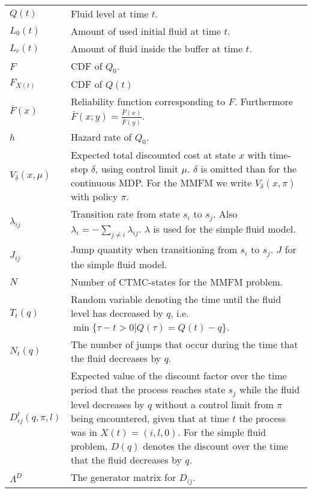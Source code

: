 \begin{tabularx}{\linewidth}{l|L}
        $Q(t)$& Fluid level at time $t$.\\
        $L_0(t)$& Amount of used initial fluid at time $t$.\\
        $L_c(t)$& Amount of fluid inside the buffer at time $t$.\\
        $F$ & CDF of $Q_0$.\\
        $F_{X(t)}$ & CDF of $Q(t)$\\
        $\bar F(x)$& Reliability function corresponding to $F$. Furthermore $\bar F(x;y)=\frac{\bar F(x)}{\bar F(y)}$.\\
        $h$& Hazard rate of $Q_0$.\\                       
		$V_\delta(x,\mu)$ & Expected total discounted cost at state $x$ with time-step $\delta$, using control limit $\mu$. $\delta$ is omitted than for the continuous MDP. For the MMFM we write $V_\delta(x,\pi)$ with policy $\pi$.            \\
		$\lambda_{ij}$& Transition rate from state $s_i$ to $s_j$. Also $\lambda_i=-\sum_{j\neq i}\lambda_{ij}$. $\lambda$ is used for the simple fluid model.\\
		$J_{ij}$& Jump quantity when transitioning from $s_i$ to $s_j$. $J$ for the simple fluid model.\\
		$N$& Number of CTMC-states for the MMFM problem.\\
		$T_t(q)$&Random variable denoting the time until the fluid level has decreased by $q$, i.e. $\min\{\tau-t>0|Q(\tau)=Q(t)-q\}$.\\
		$N_t(q)$&The number of jumps that occur during the time that the fluid decreases by $q$.\\
		$D_{ij}^t(q,\pi,l)$&Expected value of the discount factor over the time period that the process reaches state $s_j$ while the fluid level decreases by $q$ without a control limit from $\pi$ being encountered, given that at time $t$ the process was in $X(t)= (i,l,0)$. For the simple fluid problem, $D(q)$ denotes the discount over the time that the fluid decreases by $q$.\\
		$\Lambda^D$&The generator matrix for $D_{ij}$.\\
	\end{tabularx}
